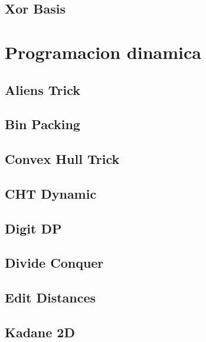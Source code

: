 \subsection{Xor Basis}
\raggedbottom
\hrulefill

\section{Programacion dinamica}
\subsection{Aliens Trick}
\raggedbottom
\hrulefill
\subsection{Bin Packing}
\raggedbottom
\hrulefill
\subsection{Convex Hull Trick}
\raggedbottom
\hrulefill
\subsection{CHT Dynamic}
\raggedbottom
\hrulefill
\subsection{Digit DP}
\raggedbottom
\hrulefill
\subsection{Divide Conquer}
\raggedbottom
\hrulefill
\subsection{Edit Distances}
\raggedbottom
\hrulefill
\subsection{Kadane 2D}
\raggedbottom
\hrulefill
